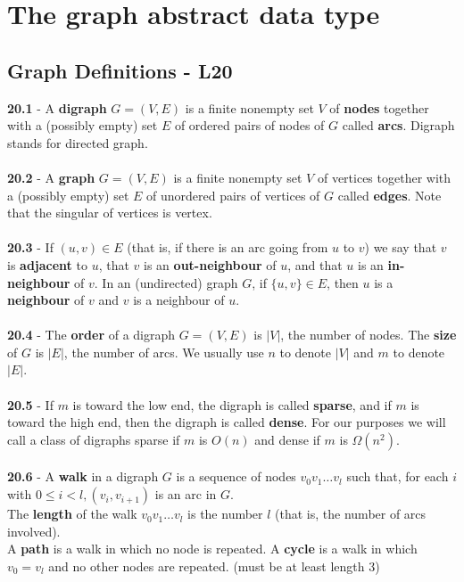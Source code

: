 \documentclass[a4paper]{article}
\begin{document}
\section{The graph abstract data type}
\subsection*{Graph Definitions - L20}
\textbf{20.1} - A \textbf{digraph} $G = (V, E)$ is a finite nonempty set $V$ of \textbf{nodes} together
with a (possibly empty) set $E$ of ordered pairs of nodes of $G$ called \textbf{arcs}. Digraph
stands for directed graph.\\\\
\textbf{20.2} - A \textbf{graph} $G = (V, E)$ is a finite nonempty set $V$ of vertices together
with a (possibly empty) set $E$ of unordered pairs of vertices of $G$ called \textbf{edges}. Note
that the singular of vertices is vertex.\\\\
\textbf{20.3} - If $(u, v) \in E$ (that is, if there is an arc going from $u$ to $v$) we say that
$v$ is \textbf{adjacent} to $u$, that $v$ is an \textbf{out-neighbour} of $u$, and that $u$ is an \textbf{in-neighbour}
of $v$. In an (undirected) graph $G$, if $\{u, v\} \in E$, then $u$ is a \textbf{neighbour} of $v$ and $v$ is a
neighbour of $u$.\\\\
\textbf{20.4} - The \textbf{order} of a digraph $G = (V, E)$ is $|V|$, the number of nodes.
The \textbf{size} of $G$ is $|E|$, the number of arcs. We usually use $n$ to denote $|V|$ and $m$ to
denote $|E|$.\\\\
\textbf{20.5} - If $m$ is toward the low end, the digraph is called \textbf{sparse}, and if $m$ is
toward the high end, then the digraph is called \textbf{dense}. For our purposes we will call a class of digraphs sparse if $m$ is $O(n)$
and dense if $m$ is $\Omega(n^2)$.\\\\
\textbf{20.6} - A \textbf{walk} in a digraph $G$ is a sequence of nodes $v_0 v_1 \dots v_l$ such
that, for each $i$ with $0 \leq i < l, (v_i, v_{i+1})$ is an arc in $G$.\\
The \textbf{length} of the walk $v_0 v_1 \dots v_l$ is the number $l$ (that is, the number of arcs involved).\\
A \textbf{path} is a walk in which no node is repeated.
A \textbf{cycle} is a walk in which $v_0 = v_l$ and no other nodes are repeated. (must be at least length 3)\\\\
\end{document}
